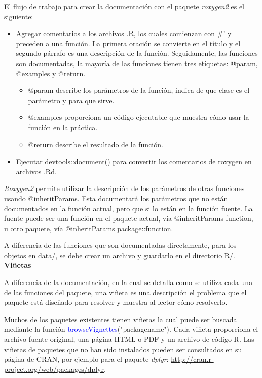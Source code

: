 El flujo de trabajo para crear la documentación con el paquete \emph{roxygen2} es el siguiente:
\begin{itemize}
\item Agregar comentarios a los archivos .R, los cuales comienzan con \#'  y preceden a una función. La primera oración se convierte en el título y el segundo párrafo es una descripción de la función. Seguidamente, las funciones son documentadas, la mayoría de las funciones tienen tres etiquetas: @param, @examples y @return.

\begin{itemize}
\item @param describe los parámetros de la función, indica de que clase es el parámetro y para que sirve.
\item @examples proporciona un código ejecutable que muestra cómo usar la función en la práctica. 
\item @return describe el resultado de la función. 
\end{itemize}
\end{itemize}
\begin{itemize}

\item Ejecutar devtools::document() para convertir los comentarios de roxygen en archivos .Rd. 

\end{itemize}

\emph{Roxygen2} permite utilizar la descripción de los parámetros de otras funciones usando @inheritParams. Esta documentará los parámetros que no están documentados en la función actual, pero que si lo están en la función fuente. La fuente puede ser una función en el paquete actual, vía @inheritParams function, u otro paquete, vía @inheritParams package::function.

A diferencia de las funciones que son documentadas directamente, para los objetos en data/, se debe crear un archivo y guardarlo en el directorio R/.\\

\textbf{Viñetas}

A diferencia de la documentación, en la cual se detalla como se utiliza cada una de las funciones del paquete, una viñeta es una descripción el problema que el paquete está diseñado para resolver y muestra al lector cómo resolverlo.

Muchos de los paquetes existentes tienen viñetas la cual puede ser buscada mediante la función \textcolor{blue}{browseVignettes}("packagename"). Cada viñeta proporciona el archivo fuente original, una página HTML o PDF y un archivo de código R. Las viñetas de paquetes que no han sido instalados pueden ser consultados en su página de CRAN, por ejemplo para el paquete \emph{dplyr}: \url{http://cran.r-project.org/web/packages/dplyr}.

